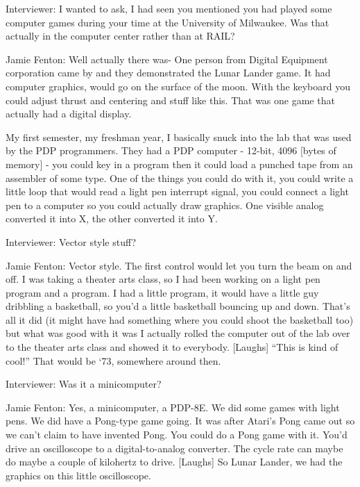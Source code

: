 \textcolor{interviewer}{Interviewer:} I wanted to ask, I had seen you mentioned you had played some computer games during your time at the University of Milwaukee. Was that actually in the computer center rather than at RAIL?

\textcolor{interviewee}{Jamie Fenton:} Well actually there was- One person from Digital Equipment corporation came by and they demonstrated the Lunar Lander game. It had computer graphics, would go on the surface of the moon. With the keyboard you could adjust thrust and centering and stuff like this. That was one game that actually had a digital display.

My first semester, my freshman year, I basically snuck into the lab that was used by the PDP programmers. They had a PDP computer - 12-bit, 4096 [bytes of memory] - you could key in a program then it could load a punched tape from an assembler of some type. One of the things you could do with it, you could write a little loop that would read a light pen interrupt signal, you could connect a light pen to a computer so you could actually draw graphics. One visible analog converted it into X, the other converted it into Y.

\textcolor{interviewer}{Interviewer:} Vector style stuff?

\textcolor{interviewee}{Jamie Fenton:} Vector style. The first control would let you turn the beam on and off. I was taking a theater arts class, so I had been working on a light pen program and a program. I had a little program, it would have a little guy dribbling a basketball, so you’d a little basketball bouncing up and down. That’s all it did (it might have had something where you could shoot the basketball too) but what was good with it was I actually rolled the computer out of the lab over to the theater arts class and showed it to everybody. [Laughs] “This is kind of cool!” That would be ‘73, somewhere around then.

\textcolor{interviewer}{Interviewer:} Was it a minicomputer?

\textcolor{interviewee}{Jamie Fenton:} Yes, a minicomputer, a PDP-8E. We did some games with light pens. We did have a Pong-type game going. It was after Atari’s Pong came out so we can’t claim to have invented Pong. You could do a Pong game with it. You’d drive an oscilloscope to a digital-to-analog converter. The cycle rate can maybe do maybe a couple of kilohertz to drive. [Laughs] So Lunar Lander, we had the graphics on this little oscilloscope.

